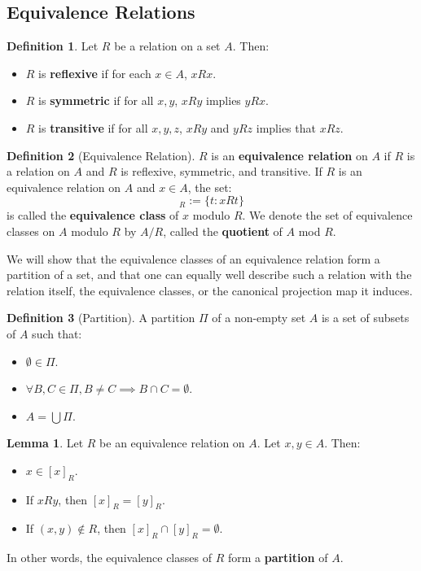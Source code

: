 \documentclass[11pt, oneside]{article}   	%
\theoremstyle{definition}
\newtheorem{definition}{Definition}[section]
\newtheorem{lemma}[theorem]{Lemma}
\begin{document}
\subsection{Equivalence Relations}

\begin{definition}
	Let $R$ be a relation on a set $A$. Then:
	\begin{itemize}
		\item $R$ is \textbf{reflexive} if for each $x\in A$, $x R x$. 
		\item $R$ is \textbf{symmetric} if for all $x, y$, $x R y$ implies $y R x$. 
		\item $R$ is \textbf{transitive} if for all $x, y, z$, $x R y$ and $y R z$ implies that $x R z$. 
	\end{itemize}
\end{definition}

\begin{definition}[Equivalence Relation]
	$R$ is an \textbf{equivalence relation} on $A$ if $R$ is a relation on $A$ and $R$ is reflexive, symmetric, and transitive. 
	If $R$ is an equivalence relation on $A$ and $x\in A$, the set:
	\begin{equation}
		[x]_R := \{t : x R t\}
	\end{equation}
	is called the \textbf{equivalence class} of $x$ modulo $R$. We denote the set of equivalence classes on $A$ modulo 
	$R$ by $A / R$, called the \textbf{quotient} of $A$ mod $R$. 
\end{definition}

We will show that the equivalence classes of an equivalence relation form a partition of a set, and that one can equally well 
describe such a relation with the relation itself, the equivalence classes, or the canonical projection map it induces.

\begin{definition}[Partition]
	A partition $\Pi$ of a non-empty set $A$ is a set of subsets of $A$ such that:
	\begin{itemize}
		\item $\emptyset\in\Pi$. 
		\item $\forall B, C\in\Pi, B\neq C\implies B\cap C = \emptyset$.
		\item $A = \bigcup\Pi$. 
	\end{itemize}
\end{definition}

\begin{lemma}
	Let $R$ be an equivalence relation on $A$. Let $x, y\in A$. Then:
	\begin{itemize}
		\item $x\in [x]_R$.
		\item If $xRy$, then $[x]_R = [y]_R$. 
		\item If $(x, y)\notin R$, then $[x]_R\cap [y]_R = \emptyset$. 
	\end{itemize}
	In other words, the equivalence classes of $R$ form a \textbf{partition} of $A$.
\end{lemma} 
\end{document}

